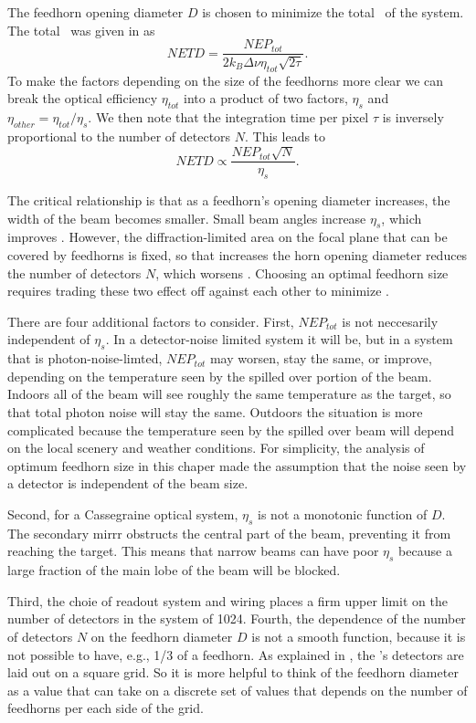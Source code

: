 The feedhorn opening diameter $D$ is chosen to minimize the total \NETD\ of the system.
The total \NETD\ was given in  as
\begin{equation}
    NETD = \frac{NEP_{tot}}{2 k_B \Delta \nu \eta_{tot} \sqrt{2 \tau}}.
\end{equation}
To make the factors depending on the size of the feedhorns more clear we can break the optical efficiency $\eta_{tot}$ into a product of two factors, $\eta_s$ and $\eta_{other} = \eta_{tot} / \eta_s$.
We then note that the integration time per pixel $\tau$ is inversely proportional to the number of detectors $N$.
This leads to
\begin{equation}
    NETD \propto \frac{NEP_{tot}\sqrt{N}}{\eta_s}.
\end{equation}

The critical relationship is that as a feedhorn's opening diameter increases, the width of the beam becomes smaller.
Small beam angles increase $\eta_s$, which improves \NETD.
However, the diffraction-limited area on the focal plane that can be covered by feedhorns is fixed, so that increases the horn opening diameter reduces the number of detectors $N$, which worsens \NETD.
Choosing an optimal feedhorn size requires trading these two effect off against each other to minimize \NETD.

There are four additional factors to consider.
First, $NEP_{tot}$ is not neccesarily independent of $\eta_s$.
In a detector-noise limited system it will be, but in a system that is photon-noise-limted, $NEP_{tot}$ may worsen, stay the same, or improve, depending on the temperature seen by the spilled over portion of the beam.
Indoors all of the beam will see roughly the same temperature as the target, so that total photon noise will stay the same.
Outdoors the situation is more complicated because the temperature seen by the spilled over beam will depend on the local scenery and weather conditions.
For simplicity, the analysis of optimum feedhorn size in this chaper made the assumption that the noise seen by a detector is independent of the beam size.

Second, for a Cassegraine optical system, $\eta_s$ is not a monotonic function of $D$.
The secondary mirrr obstructs the central part of the beam, preventing it from reaching the target.
This means that narrow beams can have poor $\eta_s$ because a large fraction of the main lobe of the beam will be blocked.

Third, the choie of readout system and wiring places a firm upper limit on the number of detectors in the system of 1024.
Fourth, the dependence of the number of detectors $N$ on the feedhorn diameter $D$ is not a smooth function, because it is not possible to have, e.g., 1/3 of a feedhorn.
As explained in , the \Imager's detectors are laid out on a square grid.
So it is more helpful to think of the feedhorn diameter as a value that can take on a discrete set of values that depends on the number of feedhorns per each side of the grid.

